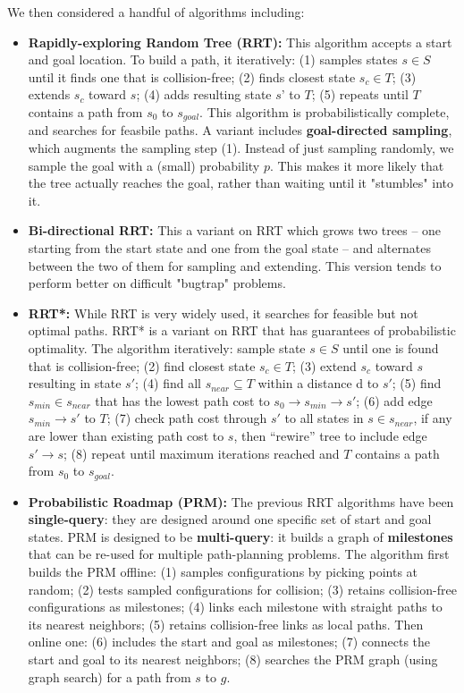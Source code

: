 \documentclass[11pt]{article}
\begin{document}
We then considered a handful of algorithms including:
\begin{itemize}
    \item {\bf{Rapidly-exploring Random Tree (RRT):}} This algorithm accepts a start and goal location. To build a path, it iteratively: (1) samples states $s \in S$ until it finds one that is collision-free; (2) finds closest state $s_c \in T$; (3) extends $s_c$ toward $s$; (4) adds resulting state $s’$ to $T$; (5) repeats until $T$ contains a path from $s_0$ to $s_{goal}$. This algorithm is probabilistically complete, and searches for feasbile paths. A variant includes {\bf{goal-directed sampling}}, which augments the sampling step (1). Instead of just sampling randomly, we sample the goal with a (small) probability $p$. This makes it more likely that the tree actually reaches the goal, rather than waiting until it "stumbles" into it.
    \item {\bf{Bi-directional RRT:}} This a variant on RRT which grows two trees -- one starting from the start state and one from the goal state -- and alternates between the two of them for sampling and extending. This version tends to perform better on difficult "bugtrap" problems.
    \item {\bf{RRT*:}} While RRT is very widely used, it searches for feasible but not optimal paths. RRT* is a variant on RRT that has guarantees of probabilistic optimality. The algorithm iteratively: sample state $s \in S$ until one is found that is collision-free; (2) find closest state $s_c \in T$; (3) extend $s_c$ toward $s$ resulting in state $s'$; (4) find all $s_{near} \subseteq T$ within a distance d to $s'$; (5) find $s_{min} \in s_{near}$ that has the lowest path cost to $s_0 \rightarrow s_{min} \rightarrow s'$; (6) add edge $s_{min} \rightarrow s'$ to $T$; (7) check path cost through $s'$ to all states in $s \in s_{near}$, if any are lower than existing path cost to $s$, then ``rewire'' tree to include edge $s' \rightarrow s$; (8) repeat until maximum iterations reached and $T$ contains a path from $s_0$ to $s_{goal}$.
    \item {\bf{Probabilistic Roadmap (PRM):}} The previous RRT algorithms have been {\bf{single-query}}: they are designed around one specific set of start and goal states. PRM is designed to be {\bf{multi-query}}: it builds a graph of {\bf{milestones}} that can be re-used for multiple path-planning problems. The algorithm first builds the PRM offline: (1) samples configurations by picking points at random; (2) tests sampled configurations for collision; (3) retains collision-free configurations as milestones; (4) links each milestone with straight paths to its nearest neighbors; (5) retains collision-free links as local paths. Then online one: (6) includes the start and goal as milestones; (7) connects the start and goal to its nearest neighbors; (8) searches the PRM graph (using graph search) for a path from $s$ to $g$.
\end{itemize}
\end{document}
